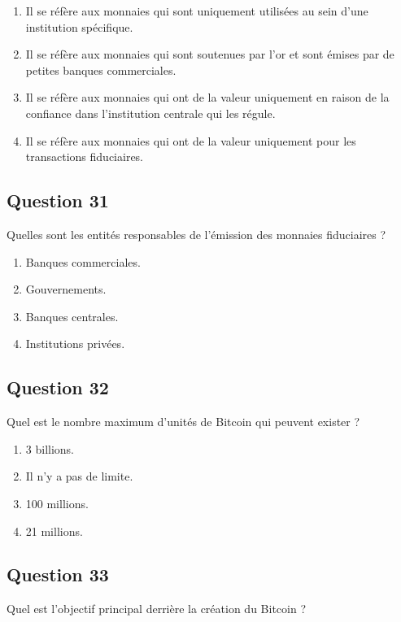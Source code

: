 \documentclass[12pt,a4paper]{article}
\begin{document}
\begin{enumerate}[label=\Alph*., leftmargin=*]
\item Il se réfère aux monnaies qui sont uniquement utilisées au sein d'une institution spécifique.
\item Il se réfère aux monnaies qui sont soutenues par l'or et sont émises par de petites banques commerciales.
\item Il se réfère aux monnaies qui ont de la valeur uniquement en raison de la confiance dans l'institution centrale qui les régule.
\item Il se réfère aux monnaies qui ont de la valeur uniquement pour les transactions fiduciaires.
\end{enumerate}

\bigskip


\subsection*{Question 31}
Quelles sont les entités responsables de l'émission des monnaies fiduciaires ?

\begin{enumerate}[label=\Alph*., leftmargin=*]
\item Banques commerciales.
\item Gouvernements.
\item Banques centrales.
\item Institutions privées.
\end{enumerate}

\bigskip


\subsection*{Question 32}
Quel est le nombre maximum d'unités de Bitcoin qui peuvent exister ?

\begin{enumerate}[label=\Alph*., leftmargin=*]
\item 3 billions.
\item Il n'y a pas de limite.
\item 100 millions.
\item 21 millions.
\end{enumerate}

\bigskip


\subsection*{Question 33}
Quel est l'objectif principal derrière la création du Bitcoin ?
\end{document}
